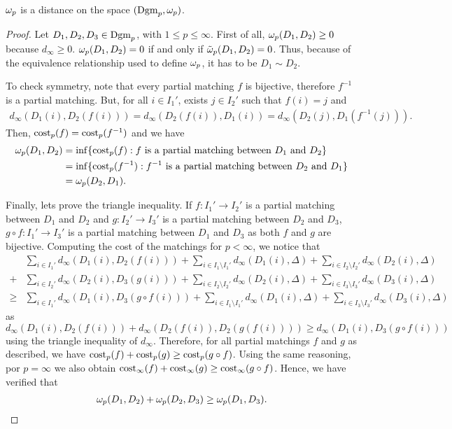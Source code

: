 \begin{proposition} \label{prop:wasserstein-is-distance}
    $\omega_p$ is a distance on the space $ (\operatorname{Dgm}_p, \omega_p) $.
\end{proposition}
\begin{proof}
    Let $ D_1, D_2, D_3 \in \operatorname{Dgm}_p$, with $ 1 \leq p \leq \infty $. First of all, $ \omega_p (D_1, D_2) \geq 0 $ because $ d_\infty \geq 0 $. $ \omega_p (D_1, D_2) = 0 $ if and only if $ \tilde \omega_p (D_1, D_2) = 0 $. Thus, because of the equivalence relationship used to define $ \omega_p $, it has to be $ D_1 \sim D_2 $.

    To check symmetry, note that every partial matching $ f $ is bijective, therefore $ f^{-1} $ is a partial matching. But, for all $ i \in I_1'$, exists $ j \in I_2' $ such that $ f(i) = j $ and
    \begin{align}
        d_\infty (D_1(i), D_2(f(i))) = d_\infty (D_2(f(i)), D_1(i)) = d_\infty (D_2(j), D_1(f^{-1}(j))).
    \end{align}
    Then, $ \operatorname{cost}_p(f) = \operatorname{cost}_p(f^{-1}) $ and we have
    \begin{align}
        \omega_p (D_1, D_2) &= \inf \{\operatorname{cost}_p(f) : f \text{ is a partial matching between } D_1 \text{ and } D_2 \} \\
        &= \inf \{\operatorname{cost}_p(f^{-1}) : f^{-1} \text{ is a partial matching between } D_2 \text{ and } D_1 \} \\
        &= \omega_p (D_2, D_1).
    \end{align}
    
    Finally, lets prove the triangle inequality. If $ f: I_1' \to I_2' $ is a partial matching between $ D_1 $ and $ D_2 $ and $ g: I_2' \to I_3' $ is a partial matching between $ D_2 $ and $ D_3 $, $ g \circ f: I_1' \to I_3' $ is a partial matching between $ D_1 $ and $ D_3 $ as both $ f $ and $ g $ are bijective. Computing the cost of the matchings for $ p < \infty$, we notice that
    \begin{align}
        &\sum_{i\in I_1'} d_\infty(D_1(i), D_2(f(i))) + \sum_{i\in I_1 \setminus I_1'} d_\infty(D_1(i), \Delta) + \sum_{i\in I_2 \setminus I_2'} d_\infty(D_2(i), \Delta) \\
        + &\sum_{i\in I_2'} d_\infty(D_2(i), D_3(g(i))) + \sum_{i\in I_2 \setminus I_2'} d_\infty(D_2(i), \Delta) + \sum_{i\in I_3 \setminus I_3'} d_\infty(D_3(i), \Delta) \\
        \geq &\sum_{i\in I_1'} d_\infty(D_1(i), D_3(g \circ f(i))) + \sum_{i\in I_1 \setminus I_1'} d_\infty(D_1(i), \Delta) + \sum_{i\in I_3 \setminus I_3'} d_\infty(D_3(i), \Delta)
    \end{align}
    as $ d_\infty(D_1(i), D_2(f(i))) + d_\infty(D_2(f(i)), D_2(g(f(i)))) \geq d_\infty(D_1(i), D_3(g \circ f(i))) $ using the triangle inequality of $ d_\infty $. Therefore, for all partial matchings $ f $ and $ g $ as described, we have $ \operatorname{cost}_p (f) + \operatorname{cost}_p (g) \geq \operatorname{cost}_p (g \circ f) $. Using the same reasoning, por $ p = \infty $ we also obtain $ \operatorname{cost}_\infty (f) + \operatorname{cost}_\infty (g) \geq \operatorname{cost}_\infty (g \circ f) $. Hence, we have verified that
    \begin{align}
        \omega_p(D_1, D_2) + \omega_p(D_2, D_3) \geq \omega_p(D_1, D_3).
    \end{align}
\end{proof}

